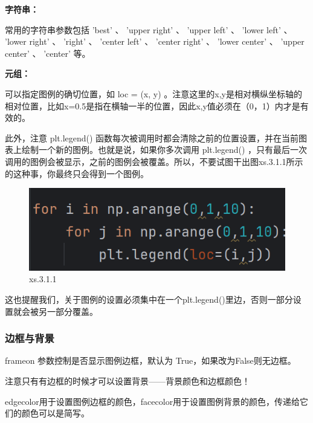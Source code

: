 \documentclass[12pt]{article}
\begin{document}
\noindent\textbf{字符串：}

常用的字符串参数包括  'best'  、  'upper right'  、  'upper left'  、  'lower left'  、  'lower right'  、  'right'  、  'center left'  、  'center right'  、  'lower center'  、  'upper center'  、  'center'  等。

\noindent\textbf{元组：}

可以指定图例的确切位置，如 loc = (x, y)  。注意这里的x,y是相对横纵坐标轴的相对位置，比如x=0.5是指在横轴一半的位置，因此x,y值必须在（0，1）内才是有效的。

此外，注意  plt.legend()   函数每次被调用时都会清除之前的位置设置，并在当前图表上绘制一个新的图例。也就是说，如果你多次调用  plt.legend()  ，只有最后一次调用的图例会被显示，之前的图例会被覆盖。所以，不要试图干出图xs.3.1.1所示的这种事，你最终只会得到一个图例。
\begin{figure}[H]
    \centering
    \includegraphics[width=0.5\linewidth]{图例 program1.png}
    \caption{xs.3.1.1}
    \label{fig:enter-label}
\end{figure}
这也提醒我们，关于图例的设置必须集中在一个plt.legend()里边，否则一部分设置就会被另一部分覆盖。
\subsubsection{边框与背景}
frameon 参数控制是否显示图例边框，默认为 True，如果改为False则无边框。

注意只有有边框的时候才可以设置背景——背景颜色和边框颜色！

edgecolor用于设置图例边框的颜色，facecolor用于设置图例背景的颜色，传递给它们的颜色可以是简写。
\end{document}
